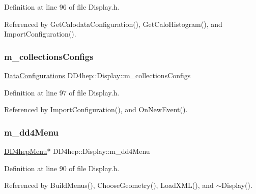 Definition at line 96 of file Display.\+h.



Referenced by Get\+Calodata\+Configuration(), Get\+Calo\+Histogram(), and Import\+Configuration().

\hypertarget{class_d_d4hep_1_1_display_af1a17085548605e16470dc43e017d209}{}\label{class_d_d4hep_1_1_display_af1a17085548605e16470dc43e017d209} 
\subsubsection{\texorpdfstring{m\+\_\+collections\+Configs}{m\_collectionsConfigs}}
{\footnotesize\ttfamily \hyperlink{class_d_d4hep_1_1_display_a730a4516989abe8b2f788c8f957e0633}{Data\+Configurations} D\+D4hep\+::\+Display\+::m\+\_\+collections\+Configs\hspace{0.3cm}{\ttfamily [protected]}}



Definition at line 97 of file Display.\+h.



Referenced by Import\+Configuration(), and On\+New\+Event().

\hypertarget{class_d_d4hep_1_1_display_ac5b8a0eed40113e808530571cfe5b9ca}{}\label{class_d_d4hep_1_1_display_ac5b8a0eed40113e808530571cfe5b9ca} 
\subsubsection{\texorpdfstring{m\+\_\+dd4\+Menu}{m\_dd4Menu}}
{\footnotesize\ttfamily \hyperlink{class_d_d4hep_1_1_d_d4hep_menu}{D\+D4hep\+Menu}$\ast$ D\+D4hep\+::\+Display\+::m\+\_\+dd4\+Menu\hspace{0.3cm}{\ttfamily [protected]}}



Definition at line 90 of file Display.\+h.



Referenced by Build\+Menus(), Choose\+Geometry(), Load\+X\+M\+L(), and $\sim$\+Display().

\hypertarget{class_d_d4hep_1_1_display_a22aad63fdd7d2db0720957c9117ee794}{}\label{class_d_d4hep_1_1_display_a22aad63fdd7d2db0720957c9117ee794} 
